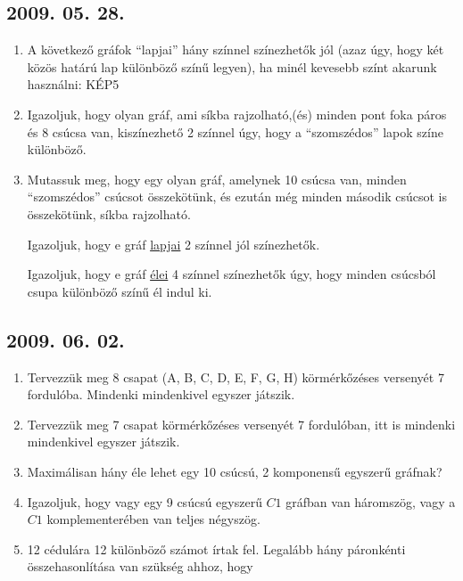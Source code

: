 \subsection*{2009. 05. 28.}
\begin{enumerate}
\item A következő gráfok “lapjai” hány színnel színezhetők jól (azaz úgy, hogy két közös határú lap különböző színű legyen), ha minél kevesebb színt akarunk használni: KÉP5
\item Igazoljuk, hogy olyan gráf, ami síkba rajzolható,(és) minden pont foka páros és 8 csúcsa van, kiszínezhető 2 színnel úgy, hogy a “szomszédos” lapok színe különböző.
\item Mutassuk meg, hogy egy olyan gráf, amelynek 10 csúcsa van, minden “szomszédos” csúcsot összekötünk, és ezután még minden második csúcsot is összekötünk, síkba rajzolható.

Igazoljuk, hogy e gráf \underline{lapjai} 2 színnel jól színezhetők.

Igazoljuk, hogy e gráf \underline{élei} 4 színnel színezhetők úgy, hogy minden csúcsból csupa különböző színű él indul ki.
\end{enumerate}


\subsection*{2009. 06. 02.}
\begin{enumerate}
\item Tervezzük meg 8 csapat (A, B, C, D, E, F, G, H) körmérkőzéses versenyét 7 fordulóba. Mindenki mindenkivel egyszer játszik.
\item Tervezzük meg 7 csapat körmérkőzéses versenyét 7 fordulóban, itt is mindenki mindenkivel egyszer játszik.
\item Maximálisan hány éle lehet egy 10 csúcsú, 2 komponensű egyszerű gráfnak?
\item Igazoljuk, hogy vagy egy 9 csúcsú egyszerű $C1$ gráfban van háromszög, vagy a  $C1$ komplementerében van teljes négyszög. 
\item 12 cédulára 12 különböző számot írtak fel. Legalább hány páronkénti összehasonlítása van szükség ahhoz, hogy
\end{enumerate}


